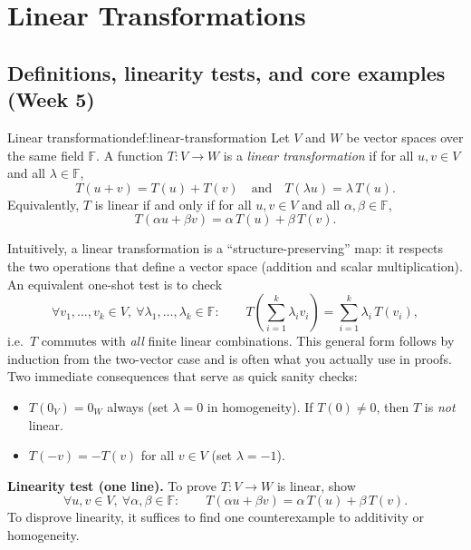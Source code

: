 
\section{Linear Transformations}


\subsection{Definitions, linearity tests, and core examples (Week 5)}

\begin{definition}{Linear transformation}{def:linear-transformation}
Let $V$ and $W$ be vector spaces over the same field $\mathbb{F}$.
A function $T:V\to W$ is a \emph{linear transformation} if for all $u,v\in V$ and all $\lambda\in\mathbb{F}$,
\[
T(u+v)=T(u)+T(v)
\quad\text{and}\quad
T(\lambda u)=\lambda\,T(u).
\]
Equivalently, $T$ is linear if and only if for all $u,v\in V$ and all $\alpha,\beta\in\mathbb{F}$,
\[
T(\alpha u+\beta v)=\alpha\,T(u)+\beta\,T(v).
\]
\end{definition}

Intuitively, a linear transformation is a ``structure-preserving'' map: it respects the two operations that define a vector space (addition and scalar multiplication).
An equivalent one-shot test is to check
\[
\forall v_1,\dots,v_k\in V,\ \forall \lambda_1,\dots,\lambda_k\in\mathbb{F}:\qquad
T\!\left(\sum_{i=1}^k \lambda_i v_i\right)=\sum_{i=1}^k \lambda_i\,T(v_i),
\]
i.e.\ $T$ commutes with \emph{all} finite linear combinations.
This general form follows by induction from the two-vector case and is often what you actually use in proofs.
Two immediate consequences that serve as quick sanity checks:
\begin{itemize}
\item $T(0_V)=0_W$ always (set $\lambda=0$ in homogeneity). If $T(0)\neq 0$, then $T$ is \emph{not} linear.
\item $T(-v)=-T(v)$ for all $v\in V$ (set $\lambda=-1$).
\end{itemize}

\begin{keyformula}
\textbf{Linearity test (one line).}
To prove $T:V\to W$ is linear, show
\[
\forall u,v\in V,\ \forall \alpha,\beta\in\mathbb{F}:\qquad
T(\alpha u+\beta v)=\alpha\,T(u)+\beta\,T(v).
\]
To disprove linearity, it suffices to find one counterexample to additivity or homogeneity.
\end{keyformula}

